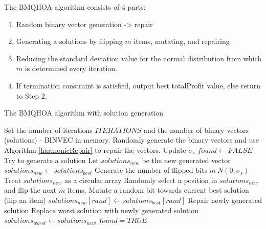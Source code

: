 \documentclass[titlepage]{article}
\begin{document}
The BMQHOA algorithm consists of 4 parts:
\begin{enumerate}
    \item Random binary vector generation -> repair
    \item Generating a solutions by flipping $m$ items, mutating, and repairing
    \item Reducing the standard deviation value for the normal distribution from which $m$ is determined every iteration.
    \item If termination constraint is satisfied, output best totalProfit value, else return to Step 2.
\end{enumerate}

\begin{breakablealgorithm}
\caption{The BMQHOA algorithm with solution generation}\label{BMQHOA}
    \begin{algorithmic}[1]
        \State Set the number of iterations $ITERATIONS$ and the number of binary vectors (solutions) - BINVEC in memory.
        \State Randomly generate the binary vectors and use Algorithm \ref{harmonicRepair} to repair the vectors. 
            \State Update $\sigma_{s}$
            \State $found \gets FALSE$
                \State Try to generate a solution
                \State Let $solutions_{new}$ be the new generated vector 
                \State $solutions_{new} \gets solutions_{best}$
                \State Generate the number of flipped bits $m ~ N(0, \sigma_{s})$
                \State Treat $solutions_{new}$ as a circular array
                \State Randomly select a position in $solutions_{new}$ and flip the next $m$ items.
                \State Mutate a random bit towards current best solution (flip an item)
                \State $solutions_{new}[rand] \gets solutions_{best}[rand]$
                \State Repair newly generated solution
                    \State Replace worst solution with newly generated solution
                    \State $solutions_{worst} \gets solutions_{new}$
                    \State $found = TRUE$
                \EndIf
            \EndWhile
        \EndWhile
    \end{algorithmic}
\end{breakablealgorithm}
\vskip 0.5cm
\end{document}
